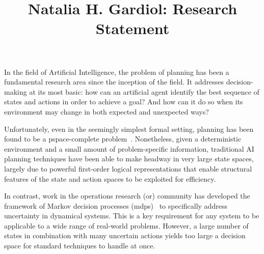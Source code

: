 \documentclass[12pt]{article}
\def\mdp{{\sc mdp}}
\begin{document}
  
\title{\vspace{-.5in} \normalsize{Natalia H. Gardiol: Research Statement}}


\maketitle

\vspace{-.25in}


In the field of Artificial Intelligence, the problem of planning has been a fundamental research area 
since the inception of the field.  It addresses decision-making at its most basic: how can an artificial agent identify the best sequence of states and actions in order to achieve a goal?  And how can it do so when its environment may change in both expected and unexpected ways?


Unfortunately, even in the seemingly simplest formal setting,
planning has
been found to be a {\sc pspace}-complete problem~\cite{bylander94}. 
 Nonetheless, given a deterministic environment and a small amount of problem-specific information, traditional AI planning techniques have been able to
make headway in very large state spaces, largely due to powerful first-order logical
representations that enable structural features of the state and
action spaces to be exploited for efficiency. 


In contrast, work
in the operations research ({\sc or}) community has developed the framework
of Markov decision processes (\mdp s)~\cite{puterman94book} to specifically address uncertainty in dynamical
systems.  
This is a key requirement for any system to be applicable to a wide range of real-world problems. 
However, a large number of states in combination with many uncertain actions
yields too large a decision space for standard techniques to handle at once.
\end{document}
